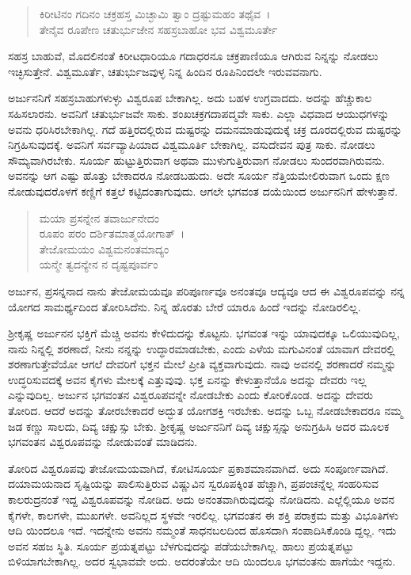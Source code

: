 \begin{verse}
ಕಿರೀಟಿನಂ ಗದಿನಂ ಚಕ್ರಹಸ್ತ ಮಿಚ್ಛಾಮಿ ತ್ವಾಂ ದ್ರಷ್ಟುಮಹಂ ತಥೈವ~।\\ತೇನೈವ ರೂಪೇಣ ಚತುರ್ಭುಜೇನ ಸಹಸ್ರಬಾಹೋ ಭವ ವಿಶ್ವಮೂರ್ತೇ 
\end{verse}

ಸಹಸ್ರ ಬಾಹುವೆ, ಮೊದಲಿನಂತೆ ಕಿರೀಟಧಾರಿಯೂ ಗದಾಧರನೂ ಚಕ್ರಪಾಣಿಯೂ ಆಗಿರುವ ನಿನ್ನನ್ನು ನೋಡಲು ಇಚ್ಛಿಸುತ್ತೇನೆ. ವಿಶ್ವಮೂರ್ತೆ, ಚತುರ್ಭುಜವುಳ್ಳ ನಿನ್ನ ಹಿಂದಿನ ರೂಪಿನಿಂದಲೇ ಇರುವವನಾಗು.

ಅರ್ಜುನನಿಗೆ ಸಹಸ್ರಬಾಹುಗಳುಳ್ಳು ವಿಶ್ವರೂಪ ಬೇಕಾಗಿಲ್ಲ. ಅದು ಬಹಳ ಉಗ್ರವಾದದು. ಅದನ್ನು ಹೆಚ್ಚುಕಾಲ ಸಹಿಸಲಾರನು. ಅವನಿಗೆ ಚತುರ್ಭುಜವೇ ಸಾಕು. ಶಂಖಚಕ್ರಗದಾಪದ್ಮವೇ ಸಾಕು. ಎಲ್ಲಾ ವಿಧವಾದ ಆಯುಧಗಳನ್ನು ಅವನು ಧರಿಸಿರಬೇಕಾಗಿಲ್ಲ. ಗದೆ ಹತ್ತಿರದಲ್ಲಿರುವ ದುಷ್ಟರನ್ನು ದಮನಮಾಡುವುದುಕ್ಕೆ ಚಕ್ರ ದೂರದಲ್ಲಿರುವ ದುಷ್ಟರನ್ನು ನಿಗ್ರಹಿಸುವುದಕ್ಕೆ. ಅವನಿಗೆ ಸರ್ವವ್ಯಾಪಿಯಾದ ವಿಶ್ವಮೂರ್ತಿ ಬೇಕಾಗಿಲ್ಲ. ವಸುದೇವನ ಪುತ್ರ ಸಾಕು. ನೋಡಲು ಸೌಮ್ಯವಾಗಿರಬೇಕು. ಸೂರ್ಯ ಹುಟ್ಟುತ್ತಿರುವಾಗ ಅಥವಾ ಮುಳುಗುತ್ತಿರುವಾಗ ನೋಡಲು ಸುಂದರವಾಗಿರುವನು. ಅವನನ್ನು ಆಗ ಎಷ್ಟು ಹೊತ್ತು ಬೇಕಾದರೂ ನೋಡಬಹುದು. ಅದೇ ಸೂರ್ಯ ನೆತ್ತಿಯಮೇಲಿರುವಾಗ ಒಂದು ಕ್ಷಣ ನೋಡುವುದರೊಳಗೆ ಕಣ್ಣಿಗೆ ಕತ್ತಲೆ ಕಟ್ಟಿದಂತಾಗುವುದು. ಆಗಲೇ ಭಗವಂತ ದಯೆಯಿಂದ ಅರ್ಜುನನಿಗೆ ಹೇಳುತ್ತಾನೆ.

\begin{verse}
ಮಯಾ ಪ್ರಸನ್ನೇನ ತವಾರ್ಜುನೇದಂ \\ ರೂಪಂ ಪರಂ ದರ್ಶಿತಮಾತ್ಮಯೋಗಾತ್~।\\ತೇಜೋಮಯಂ ವಿಶ್ವಮನಂತಮಾದ್ಯಂ \\ ಯನ್ಮೇ ತ್ವದನ್ಯೇನ ನ ದೃಷ್ಟಪೂರ್ವಂ 
\end{verse}

{\small ಅರ್ಜುನ, ಪ್ರಸನ್ನನಾದ ನಾನು ತೇಜೋಮಯವೂ ಪರಿಪೂರ್ಣವೂ ಅನಂತವೂ ಆದ್ಯವೂ ಆದ ಈ ವಿಶ್ವರೂಪವನ್ನು ನನ್ನ ಯೋಗದ ಸಾಮರ್ಥ್ಯದಿಂದ ತೋರಿಸಿದೆನು. ನಿನ್ನ ಹೊರತು ಬೇರೆ ಯಾರೂ ಹಿಂದೆ ಇದನ್ನು ನೋಡಿರಲಿಲ್ಲ.}

ಶ‍್ರೀಕೃಷ್ಣ ಅರ್ಜುನನ ಭಕ್ತಿಗೆ ಮೆಚ್ಚಿ ಅವನು ಕೇಳಿದುದನ್ನು ಕೊಟ್ಟನು. ಭಗವಂತ ಇನ್ನು ಯಾವುದಕ್ಕೂ ಒಲಿಯುವುದಿಲ್ಲ, ನಾನು ನಿನ್ನಲ್ಲಿ ಶರಣಾದೆ, ನೀನು ನನ್ನನ್ನು ಉದ್ಧಾರಮಾಡಬೇಕು, ಎಂದು ಎಳೆಯ ಮಗುವಿನಂತೆ ಯಾವಾಗ ದೇವರಲ್ಲಿ ಶರಣಾಗುತ್ತೇವೆಯೋ ಆಗಲೆ ದೇವರಿಗೆ ಭಕ್ತನ ಮೇಲೆ ಪ್ರೀತಿ ವ್ಯಕ್ತವಾಗುವುದು. ನಾವು ಅವನಲ್ಲಿ ಶರಣಾದರೆ ನಮ್ಮನ್ನು ಉದ್ಧರಿಸುವದಕ್ಕೆ ಅವನ ಕೈಗಳು ಮೇಲಕ್ಕೆ ಎತ್ತುವುವು. ಭಕ್ತ ಏನನ್ನು ಕೇಳುತ್ತಾನೆಯೊ ಅದನ್ನು ದೇವರು ಇಲ್ಲ ಎನ್ನುವುದಿಲ್ಲ. ಅರ್ಜುನ ಭಗವಂತನ ವಿಶ್ವರೂಪವನ್ನೇ ನೋಡಬೇಕು ಎಂದು ಕೋರಿಕೊಂಡ. ಅದನ್ನು ದೇವರು ತೋರಿದ. ಆದರೆ ಅದನ್ನು ತೋರಬೇಕಾದರೆ ಅದ್ಭುತ ಯೋಗಶಕ್ತಿ ಇರಬೇಕು. ಅದನ್ನು ಒಬ್ಬ ನೋಡಬೇಕಾದರೂ ನಮ್ಮ ಜಡ ಕಣ್ಣು ಸಾಲದು, ದಿವ್ಯ ಚಕ್ಷುಸ್ಸು ಬೇಕು. ಶ‍್ರೀಕೃಷ್ಣ ಅರ್ಜುನನಿಗೆ ದಿವ್ಯ ಚಕ್ಷುಸ್ಸನ್ನು ಅನುಗ್ರಹಿಸಿ ಅದರ ಮೂಲಕ ಭಗವಂತನ ವಿಶ್ವರೂಪವನ್ನು ನೋಡುವಂತೆ ಮಾಡಿದನು.

ತೋರಿದ ವಿಶ್ವರೂಪವು ತೇಜೋಮಯವಾಗಿದೆ, ಕೋಟಿಸೂರ್ಯ ಪ್ರಕಾಶಮಾನವಾಗಿದೆ. ಅದು ಸಂಪೂರ್ಣವಾಗಿದೆ. ದಯಾಮಯನಾದ ಸೃಷ್ಟಿಯನ್ನು ಪಾಲಿಸುತ್ತಿರುವ ವಿಷ್ಣುವಿನ ಸ್ವರೂಪಕ್ಕಿಂತ ಹೆಚ್ಚಾಗಿ, ಪ್ರಪಂಚನ್ನೆಲ್ಲ ಸಂಹರಿಸುವ ಕಾಲರುದ್ರನಂತೆ ಇದ್ದ ವಿಶ್ವರೂಪವನ್ನು ನೋಡಿದ. ಅದು ಅನಂತವಾಗಿರುವುದನ್ನು ನೋಡಿದನು. ಎಲ್ಲೆಲ್ಲಿಯೂ ಅವನ ಕೈಗಳೇ, ಕಾಲಗಳೇ, ಮುಖಗಳೇ. ಅವನಿಲ್ಲದ ಸ್ಥಳವೇ ಇರಲಿಲ್ಲ. ಭಗವಂತನ ಈ ಶಕ್ತಿ ಪರಾಕ್ರಮ ಮತ್ತು ವಿಭೂತಿಗಳು ಆದಿ ಯಿಂದಲೂ ಇದೆ. ಇದನ್ನೇನು ಅವನು ನಮ್ಮಂತೆ ಸಾಧನಬಲದಿಂದ ಹೊಸದಾಗಿ ಸಂಪಾದಿಸಿಕೊಂಡಿ ದ್ದಲ್ಲ. ಇದು ಅವನ ಸಹಜ ಸ್ಥಿತಿ. ಸೂರ್ಯ ಪ್ರಯತ್ನಪಟ್ಟು ಬೆಳಗುವುದನ್ನು ಪಡೆಯಬೇಕಾಗಿಲ್ಲ. ಹಾಲು ಪ್ರಯತ್ನಪಟ್ಟು ಬಿಳಿಯಾಗಬೇಕಾಗಿಲ್ಲ. ಅದರ ಸ್ವಭಾವವೇ ಅದು. ಅದರಂತೆಯೇ ಆದಿ ಯಿಂದಲೂ ಭಗವಂತನು ಹಾಗೆಯೇ ಇದ್ದನು.

